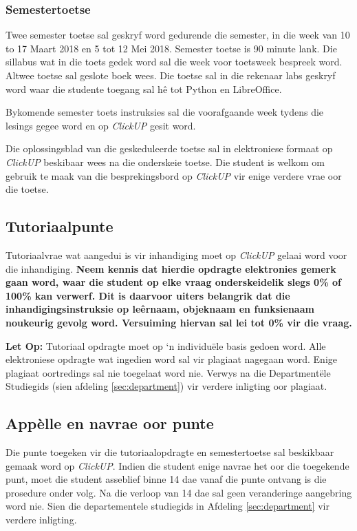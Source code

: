     \subsubsection{Semestertoetse}
        Twee semester toetse sal geskryf word gedurende die semester, in die
        week van 10 to 17 Maart 2018 en 5 tot 12 Mei 2018. Semester
        toetse is 90 minute lank. Die sillabus wat in die toets gedek word sal
        die week voor toetsweek bespreek word. Altwee toetse sal geslote boek
        wees. Die toetse sal in die rekenaar labs geskryf word waar die
        studente toegang sal h\^{e} tot Python en LibreOffice.

        Bykomende semester toets instruksies sal die voorafgaande week tydens
        die lesings gegee word en op \textit{ClickUP} gesit word.

        Die oplossingsblad van die geskeduleerde toetse sal in elektroniese
        formaat op \textit{ClickUP} beskibaar wees na die onderskeie toetse.
        Die student is welkom om gebruik te maak van die besprekingsbord op
        \textit{ClickUP} vir enige verdere vrae oor die toetse.

    \subsection{Tutoriaalpunte} \label{sec:tutoriaal}
        Tutoriaalvrae wat aangedui is vir inhandiging moet op \textit{ClickUP}
        gelaai word voor die inhandiging. \textbf{Neem kennis dat hierdie
        opdragte elektronies gemerk gaan word, waar die student op elke
        vraag onderskeidelik slegs 0\% of 100\% kan verwerf. Dit is
        daarvoor uiters belangrik dat die inhandigingsinstruksie op
        le\^ernaam, objeknaam en funksienaam noukeurig gevolg word.
        Versuiming hiervan sal lei tot 0\% vir die vraag.}

        \textbf{Let Op:} Tutoriaal opdragte moet op `n individu\"ele basis
        gedoen word. Alle elektroniese opdragte wat ingedien word sal vir
        plagiaat nagegaan word. Enige plagiaat oortredings sal nie toegelaat
        word nie.  Verwys na die Department\"ele Studiegids (sien afdeling
        \ref{sec:department}) vir verdere inligting oor plagiaat.

    \subsection{App\`{e}lle en navrae oor punte}
        Die punte toegeken vir die tutoriaalopdragte en semestertoetse sal
        beskikbaar gemaak word op \textit{ClickUP}. Indien die student enige
        navrae het oor die toegekende punt, moet die student asseblief binne 14
        dae vanaf die punte ontvang is die prosedure onder volg.  Na die
        verloop van 14 dae sal geen veranderinge aangebring word nie. Sien die
        departementele studiegids in Afdeling \ref{sec:department} vir verdere
        inligting.

